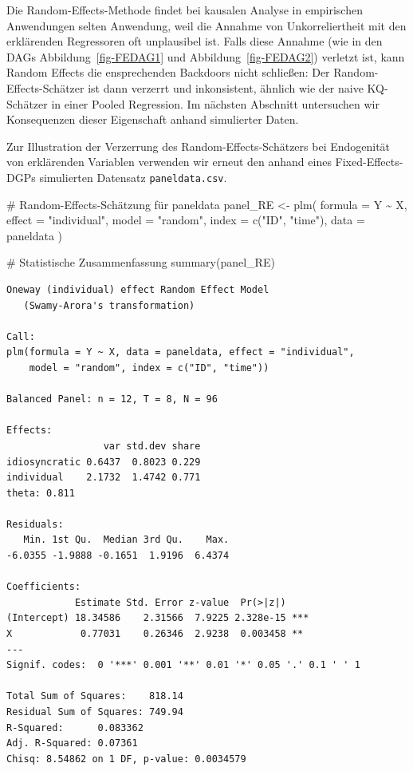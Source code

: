 \documentclass[
  a4paper,
  DIV=11,
  oneside]{scrreprt}
\newenvironment{Shaded}{\begin{snugshade}}{\end{snugshade}}
\newcommand{\AttributeTok}[1]{\textcolor[rgb]{0.40,0.45,0.13}{#1}}
\newcommand{\CommentTok}[1]{\textcolor[rgb]{0.37,0.37,0.37}{#1}}
\newcommand{\FunctionTok}[1]{\textcolor[rgb]{0.28,0.35,0.67}{#1}}
\newcommand{\NormalTok}[1]{\textcolor[rgb]{0.00,0.23,0.31}{#1}}
\newcommand{\OtherTok}[1]{\textcolor[rgb]{0.00,0.23,0.31}{#1}}
\newcommand{\SpecialCharTok}[1]{\textcolor[rgb]{0.37,0.37,0.37}{#1}}
\newcommand{\StringTok}[1]{\textcolor[rgb]{0.13,0.47,0.30}{#1}}
\begin{document}
Die Random-Effects-Methode findet bei kausalen Analyse in empirischen
Anwendungen selten Anwendung, weil die Annahme von Unkorreliertheit mit
den erklärenden Regressoren oft unplausibel ist. Falls diese Annahme
(wie in den DAGs Abbildung~\ref{fig-FEDAG1} und
Abbildung~\ref{fig-FEDAG2}) verletzt ist, kann Random Effects die
ensprechenden Backdoors nicht schließen: Der Random-Effects-Schätzer ist
dann verzerrt und inkonsistent, ähnlich wie der naive KQ-Schätzer in
einer Pooled Regression. Im nächsten Abschnitt untersuchen wir
Konsequenzen dieser Eigenschaft anhand simulierter Daten.

Zur Illustration der Verzerrung des Random-Effects-Schätzers bei
Endogenität von erklärenden Variablen verwenden wir erneut den anhand
eines Fixed-Effects-DGPs simulierten Datensatz \texttt{paneldata.csv}.

\begin{Shaded}
\begin{Highlighting}[]
\CommentTok{\# Random{-}Effects{-}Schätzung für \textasciigrave{}paneldata\textasciigrave{}}
\NormalTok{panel\_RE }\OtherTok{\textless{}{-}} \FunctionTok{plm}\NormalTok{(}
  \AttributeTok{formula =}\NormalTok{ Y }\SpecialCharTok{\textasciitilde{}}\NormalTok{ X, }
  \AttributeTok{effect =} \StringTok{"individual"}\NormalTok{,}
  \AttributeTok{model =} \StringTok{"random"}\NormalTok{,}
  \AttributeTok{index =} \FunctionTok{c}\NormalTok{(}\StringTok{"ID"}\NormalTok{, }\StringTok{"time"}\NormalTok{),  }
  \AttributeTok{data =}\NormalTok{ paneldata}
\NormalTok{)}

\CommentTok{\# Statistische Zusammenfassung}
\FunctionTok{summary}\NormalTok{(panel\_RE)}
\end{Highlighting}
\end{Shaded}

\begin{verbatim}
Oneway (individual) effect Random Effect Model 
   (Swamy-Arora's transformation)

Call:
plm(formula = Y ~ X, data = paneldata, effect = "individual", 
    model = "random", index = c("ID", "time"))

Balanced Panel: n = 12, T = 8, N = 96

Effects:
                 var std.dev share
idiosyncratic 0.6437  0.8023 0.229
individual    2.1732  1.4742 0.771
theta: 0.811

Residuals:
   Min. 1st Qu.  Median 3rd Qu.    Max. 
-6.0355 -1.9888 -0.1651  1.9196  6.4374 

Coefficients:
            Estimate Std. Error z-value  Pr(>|z|)    
(Intercept) 18.34586    2.31566  7.9225 2.328e-15 ***
X            0.77031    0.26346  2.9238  0.003458 ** 
---
Signif. codes:  0 '***' 0.001 '**' 0.01 '*' 0.05 '.' 0.1 ' ' 1

Total Sum of Squares:    818.14
Residual Sum of Squares: 749.94
R-Squared:      0.083362
Adj. R-Squared: 0.07361
Chisq: 8.54862 on 1 DF, p-value: 0.0034579
\end{verbatim}
\end{document}
